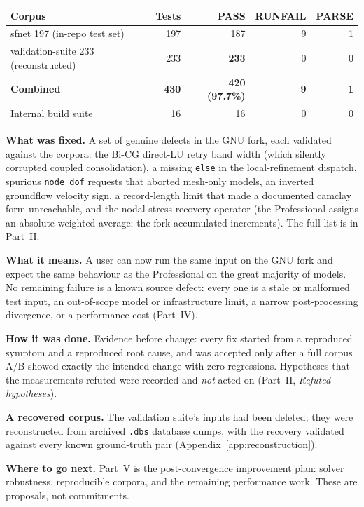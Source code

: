 \documentclass[11pt,a4paper]{report}
\newcommand{\code}[1]{\texttt{#1}}
\begin{document}
\begin{center}
\begin{tabular}{@{}L{5.4cm}rrrr@{}}
\toprule
Corpus & Tests & PASS & RUNFAIL & PARSE \\
\midrule
sfnet 197 (in-repo test set)          & 197 & 187 & 9 & 1 \\
validation-suite 233 (reconstructed)  & 233 & \textbf{233} & 0 & 0 \\
\textbf{Combined}                     & \textbf{430} & \textbf{420 (97.7\%)} & \textbf{9} & \textbf{1} \\
Internal build suite                  & 16 & 16 & 0 & 0 \\
\bottomrule
\end{tabular}
\end{center}

\textbf{What was fixed.} A set of genuine defects in the GNU fork, each
validated against the corpora: the Bi-CG direct-LU retry band width (which
silently corrupted coupled consolidation), a missing \code{else} in the
local-refinement dispatch, spurious \code{node\_\allowbreak dof} requests that aborted
mesh-only models, an inverted groundflow velocity sign, a record-length limit
that made a documented camclay form unreachable, and the nodal-stress recovery
operator (the Professional assigns an absolute weighted average; the fork
accumulated increments). The full list is in Part~II.

\textbf{What it means.} A user can now run the same input on the GNU fork and
expect the same behaviour as the Professional on the great majority of models.
No remaining failure is a known source defect: every one is a stale or
malformed test input, an out-of-scope model or infrastructure limit, a narrow
post-processing divergence, or a performance cost (Part~IV).

\textbf{How it was done.} Evidence before change: every fix started from a
reproduced symptom and a reproduced root cause, and was accepted only after a
full corpus A/B showed exactly the intended change with zero regressions.
Hypotheses that the measurements refuted were recorded and \emph{not} acted on
(Part~II, \emph{Refuted hypotheses}).

\textbf{A recovered corpus.} The validation suite's inputs had been deleted;
they were reconstructed from archived \code{.dbs} database dumps, with the
recovery validated against every known ground-truth pair
(Appendix~\ref{app:reconstruction}).

\textbf{Where to go next.} Part~V is the post-convergence improvement plan:
solver robustness, reproducible corpora, and the remaining performance work.
These are proposals, not commitments.
\end{document}
